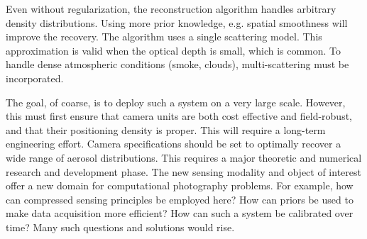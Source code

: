 \documentclass[10pt,twocolumn,letterpaper]{article}
\begin{document}
Even without regularization, the reconstruction algorithm handles arbitrary density distributions. Using more prior knowledge, e.g. spatial smoothness will improve the recovery.
The algorithm uses a single scattering model. This approximation is valid
when the optical depth is small, which is common. To handle dense atmospheric
conditions (smoke, clouds), multi-scattering must be incorporated.

The goal, of coarse, is to deploy such a system on a very large scale. However, this must first ensure that camera units are both cost effective and field-robust, and that their positioning density is proper. This will require a long-term engineering effort. Camera specifications should be set to optimally recover a wide range of aerosol distributions. This requires a major theoretic and numerical research and development phase.
The new sensing modality and object of interest offer a new domain for computational photography problems. For example, how can compressed sensing principles be employed here? How can priors be used to make data acquisition more efficient? How can such a system be calibrated over time? Many such questions and solutions would rise.




\end{document}
